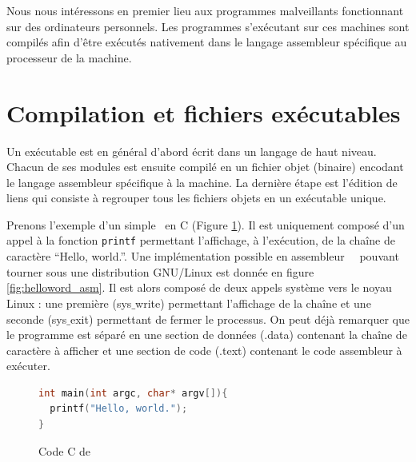 
Nous nous intéressons en premier lieu aux programmes malveillants fonctionnant sur des ordinateurs personnels.
Les programmes s'exécutant sur ces machines sont compilés afin d'être exécutés nativement dans le langage assembleur spécifique au processeur de la machine.

\section{Compilation et fichiers exécutables}
Un exécutable est en général d'abord écrit dans un langage de haut niveau. Chacun de ses modules est ensuite compilé en un fichier objet (binaire) encodant le langage assembleur spécifique à la machine. La dernière étape est l'édition de liens qui consiste à regrouper tous les fichiers objets en un exécutable unique.

Prenons l'exemple d'un simple \helloworld\ en C (Figure \ref{fig:helloword_c}). Il est uniquement composé d'un appel à la fonction \texttt{printf} permettant l'affichage, à l'exécution, de la chaîne de caractère ``Hello, world.''.
Une implémentation possible en assembleur \nasm\ \xq\ pouvant tourner sous une distribution GNU/Linux est donnée en figure \ref{fig:helloword_asm}. Il est alors composé de deux appels système vers le noyau Linux : une première (sys$\_$write) permettant l'affichage de la chaîne et une seconde (sys$\_$exit) permettant de fermer le processus.
On peut déjà remarquer que le programme est séparé en une section de données (.data) contenant la chaîne de caractère à afficher et une section de code (.text) contenant le code assembleur à exécuter.
\begin{figure}
\begin{lstlisting}[language={C}]
int main(int argc, char* argv[]){
  printf("Hello, world.");
}
\end{lstlisting}
\caption{Code C de \helloworld}
\label{fig:helloword_c}
\end{figure}


